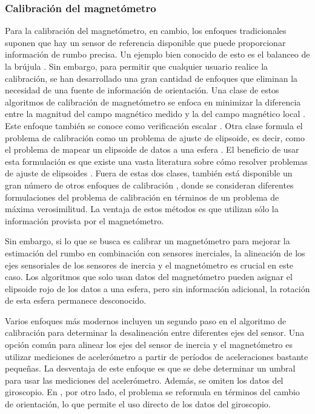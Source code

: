 \subsubsection{Calibración del magnetómetro}
Para la calibración del magnetómetro, en cambio, los enfoques tradicionales suponen que hay un sensor de referencia disponible que puede proporcionar información de rumbo precisa. Un ejemplo bien conocido de esto es el balanceo de la brújula \cite{gebre2006}. Sin embargo, para permitir que cualquier usuario realice la calibración, se han desarrollado una gran cantidad de enfoques que eliminan la necesidad de una fuente de información de orientación. Una clase de estos algoritmos de calibración de magnetómetro se enfoca en minimizar la diferencia entre la magnitud del campo magnético medido y la del campo magnético local \cite{gustaffson2012}. Este enfoque también se conoce como verificación escalar \cite{hol2011}. Otra clase formula el problema de calibración como un problema de ajuste de elipsoide, es decir, como el problema de mapear un elipsoide de datos a una esfera \cite{kailath2000}. El beneficio de usar esta formulación es que existe una vasta literatura sobre cómo resolver problemas de ajuste de elipsoides \cite{lindsten2013}. Fuera de estas dos clases, también está disponible un gran número de otros enfoques de calibración \cite{markovsky2004}, donde se consideran diferentes formulaciones del problema de calibración en términos de un problema de máxima verosimilitud. La ventaja de estos métodos es que utilizan sólo la información provista por el magnetómetro.

Sin embargo, si lo que se busca es calibrar un magnetómetro para mejorar la estimación del rumbo en combinación con sensores inerciales, la alineación de los ejes sensoriales de los sensores de inercia y el magnetómetro es crucial en este caso. Los algoritmos que solo usan datos del magnetómetro pueden asignar el elipsoide rojo de los datos a una esfera, pero sin información adicional, la rotación de esta esfera permanece desconocido.

Varios enfoques más modernos incluyen un segundo paso en el algoritmo de calibración para determinar la desalineación \cite{nocedal2006} entre diferentes ejes del sensor. Una opción común para alinear los ejes del sensor de inercia y el magnetómetro es utilizar mediciones de acelerómetro a partir de períodos de aceleraciones bastante pequeñas. La desventaja de este enfoque es que se debe determinar un umbral para usar las mediciones del acelerómetro. Además, se omiten los datos del giroscopio. En \cite{salehi2012}, por otro lado, el problema se reformula en términos del cambio de orientación, lo que permite el uso directo de los datos del giroscopio.
\fi

